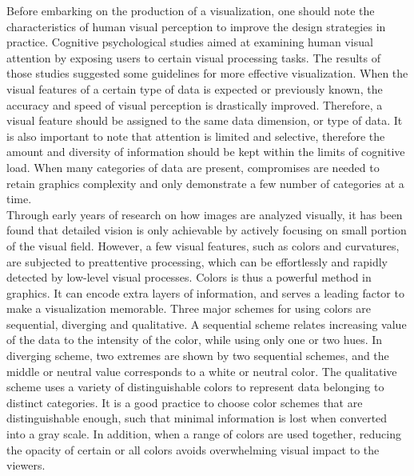 \documentclass[11pt, a4paper,oneside,chapterprefix=false]{scrbook}
\begin{document}
Before embarking on the production of a visualization, one should note the characteristics of human visual perception to improve the design strategies in practice. Cognitive psychological studies aimed at examining human visual attention by exposing users to certain visual processing tasks. The results of those studies suggested some guidelines for more effective visualization. When the visual features of a certain type of data is expected or previously known, the accuracy and speed of visual perception is drastically improved. Therefore, a visual feature should be assigned to the same data dimension, or type of data. It is also important to note that attention is limited and selective, therefore the amount and diversity of information should be kept within the limits of cognitive load. When many categories of data are present, compromises are needed to retain graphics complexity and only demonstrate a few number of categories at a time. \\

Through early years of research on how images are analyzed visually, it has been found that detailed vision is only achievable by actively focusing on small portion of the visual field. However, a few visual features, such as colors and curvatures, are subjected to preattentive processing, which can be effortlessly and rapidly detected by low-level visual processes. Colors is thus a powerful method in graphics. It can encode extra layers of information, and serves a leading factor to make a visualization memorable. Three major schemes for using colors are sequential, diverging and qualitative. A sequential scheme relates increasing value of the data to the intensity of the color, while using only one or two hues. In diverging scheme, two extremes are shown by two sequential schemes, and the middle or neutral value corresponds to a white or neutral color. The qualitative scheme uses a variety of distinguishable colors to represent data belonging to distinct categories. It is a good practice to choose color schemes that are distinguishable enough, such that minimal information is lost when converted into a gray scale. In addition, when a range of colors are used together, reducing the opacity of certain or all colors avoids overwhelming visual impact to the viewers. \\
\end{document}
